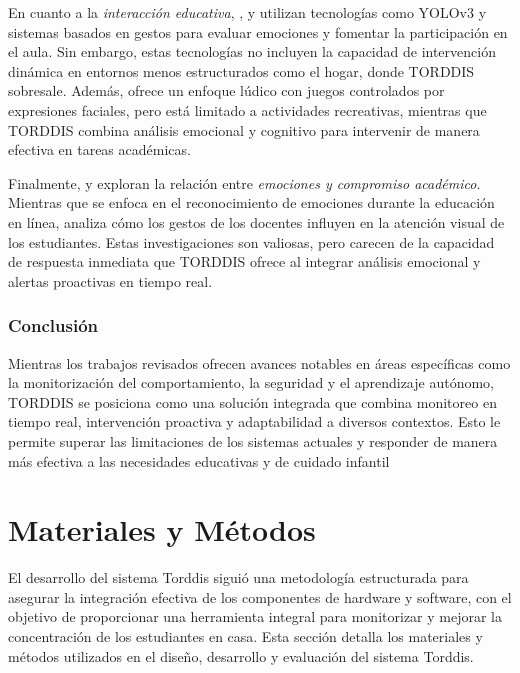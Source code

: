 \documentclass[a4paper,fleqn]{cas-sc}
\begin{document}
	En cuanto a la \textit{interacción educativa}, \cite{Nguyen2019}, \cite{Argel2023Intellitell} y \cite{Erazo2016Easing} utilizan tecnologías como YOLOv3 y sistemas basados en gestos para evaluar emociones y fomentar la participación en el aula. Sin embargo, estas tecnologías no incluyen la capacidad de intervención dinámica en entornos menos estructurados como el hogar, donde TORDDIS sobresale. Además, \cite{Muller2018ArchnSmile} ofrece un enfoque lúdico con juegos controlados por expresiones faciales, pero está limitado a actividades recreativas, mientras que TORDDIS combina análisis emocional y cognitivo para intervenir de manera efectiva en tareas académicas.
	
	Finalmente, \cite{Enadula2021} y \cite{Farsani2020} exploran la relación entre \textit{emociones y compromiso académico}. Mientras que \cite{Enadula2021} se enfoca en el reconocimiento de emociones durante la educación en línea, \cite{Farsani2020} analiza cómo los gestos de los docentes influyen en la atención visual de los estudiantes. Estas investigaciones son valiosas, pero carecen de la capacidad de respuesta inmediata que TORDDIS ofrece al integrar análisis emocional y alertas proactivas en tiempo real.
	
	\subsubsection{Conclusión}
	Mientras los trabajos revisados ofrecen avances notables en áreas específicas como la monitorización del comportamiento, la seguridad y el aprendizaje autónomo, TORDDIS se posiciona como una solución integrada que combina monitoreo en tiempo real, intervención proactiva y adaptabilidad a diversos contextos. Esto le permite superar las limitaciones de los sistemas actuales y responder de manera más efectiva a las necesidades educativas y de cuidado infantil
		
	\section{Materiales y Métodos}
	\label{seccion:Cuatro}
	El desarrollo del sistema Torddis siguió una metodología estructurada para asegurar la integración efectiva de los componentes de hardware y software, con el objetivo de proporcionar una herramienta integral para monitorizar y mejorar la concentración de los estudiantes en casa. Esta sección detalla los materiales y métodos utilizados en el diseño, desarrollo y evaluación del sistema Torddis.
	
\end{document}
